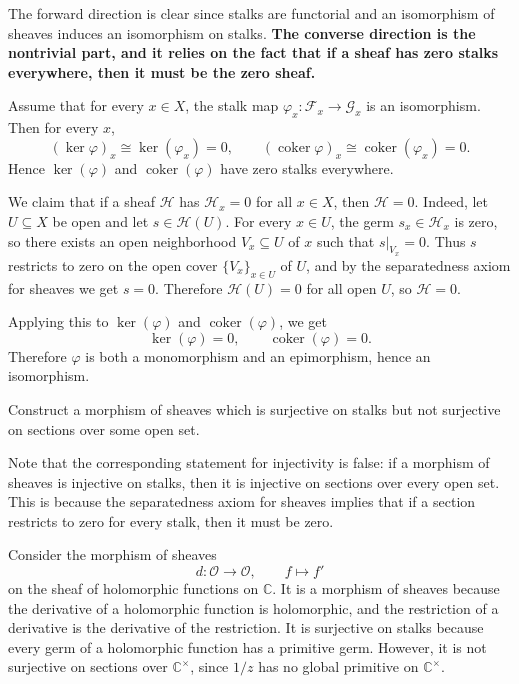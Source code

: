 \documentclass[12pt]{article}
\begin{document}
The forward direction is clear since stalks are functorial and an isomorphism of sheaves induces an isomorphism on stalks. \textbf{The converse direction is the nontrivial part, and it relies on the fact that if a sheaf has zero stalks everywhere, then it must be the zero sheaf.}
\begin{solution}
    Assume that for every $x\in X$, the stalk map $\varphi_x:\mathcal F_x\to\mathcal G_x$
    is an isomorphism. Then for every $x$,
    \[
        (\ker\varphi)_x \cong \ker(\varphi_x)=0,
        \qquad
        (\operatorname{coker}\varphi)_x \cong \operatorname{coker}(\varphi_x)=0.
    \]
    Hence $\ker(\varphi)$ and $\operatorname{coker}(\varphi)$ have zero stalks everywhere.

    We claim that if a sheaf $\mathcal H$ has $\mathcal H_x=0$ for all $x\in X$, then $\mathcal H=0$. Indeed, let $U\subseteq X$ be open and let $s\in\mathcal H(U)$. For every $x\in U$, the germ $s_x\in\mathcal H_x$ is zero, so there exists an open neighborhood $V_x\subseteq U$ of $x$ such that $s|_{V_x}=0$. Thus $s$ restricts to zero on the open cover $\{V_x\}_{x\in U}$ of $U$, and by the separatedness axiom for sheaves we get $s=0$. Therefore $\mathcal H(U)=0$ for all open $U$, so $\mathcal H=0$.

    Applying this to $\ker(\varphi)$ and $\operatorname{coker}(\varphi)$, we get
    \[
        \ker(\varphi)=0,\qquad \operatorname{coker}(\varphi)=0.
    \]
    Therefore $\varphi$ is both a monomorphism and an epimorphism, hence an isomorphism.
\end{solution}

\begin{exercise}
    Construct a morphism of sheaves which is surjective on stalks but not surjective on sections over some open set.
\end{exercise}

Note that the corresponding statement for injectivity is false: if a morphism of sheaves is injective on stalks, then it is injective on sections over every open set. This is because the separatedness axiom for sheaves implies that if a section restricts to zero for every stalk, then it must be zero.

\begin{solution}
    Consider the morphism of sheaves \[
        d : \mathcal O \to \mathcal O,
        \qquad f \mapsto f'\]
    on the sheaf of holomorphic functions on $\mathbb C$. It is a morphism of sheaves because the derivative of a holomorphic function is holomorphic, and the restriction of a derivative is the derivative of the restriction. It is surjective on stalks because every germ of a holomorphic function has a primitive germ. However, it is not surjective on sections over $\mathbb{C}^{\times}$, since $1/z$ has no global primitive on $\mathbb{C}^{\times}$.
\end{solution}
\end{document}
